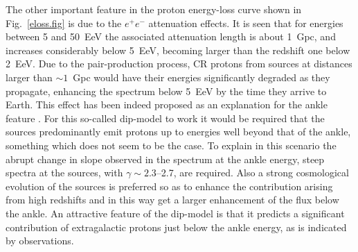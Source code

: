 \documentclass[twoside,12pt]{article}
\begin{document}
The other important feature in the proton energy-loss curve shown in Fig.~\ref{eloss.fig} is due to the $e^+e^-$ attenuation effects. It is seen that for energies between 5 and 50~EeV the associated attenuation length is about 1~Gpc, and increases considerably below 5~EeV, becoming larger than the redshift one below 2~EeV. Due to the pair-production process,  CR protons from sources at distances larger than $\sim 1$~Gpc would have their energies significantly degraded as they propagate, enhancing the spectrum below 5~EeV by the time they arrive to Earth. This effect has been indeed proposed as an explanation for the ankle feature \cite{dip}. For this so-called dip-model to work it would be required that the sources predominantly emit protons up to energies well beyond that of the ankle, something which does not seem to be the case. To explain in this scenario the abrupt change in slope observed in the spectrum at the ankle energy, steep spectra at the sources, with $\gamma\sim 2.3$--2.7, are required. Also a strong cosmological evolution of the sources is preferred so as to enhance the contribution arising from high redshifts and in this way get a larger enhancement of the flux below the ankle. An attractive feature of the dip-model is that it predicts a significant contribution of extragalactic protons just below the ankle energy, as is indicated by observations.
\end{document}
